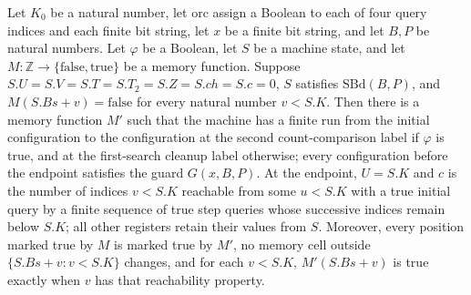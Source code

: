 \begin{theorem}
\label{Complexity.LogProg.ExpBFS.search_run}
\leanok
{}
Let $K_0$ be a natural number, let $\mathrm{orc}$ assign a Boolean to each of four query
indices and each finite bit string, let $x$ be a finite bit string, and let $B,P$ be
natural numbers. Let $\varphi$ be a Boolean, let $S$ be a machine state, and let
$M:\mathbb{Z}\to\{\mathrm{false},\mathrm{true}\}$ be a memory function. Suppose
$S.U=S.V=S.T=S.T_2=S.Z=S.ch=S.c=0$, $S$ satisfies $\mathrm{SBd}(B,P)$, and
$M(S.Bs+v)=\mathrm{false}$ for every natural number $v<S.K$. Then there is a memory
function $M'$ such that the machine has a finite run from the initial configuration to
the configuration at the second count-comparison label if $\varphi$ is true, and at the
first-search cleanup label otherwise; every configuration before the endpoint satisfies
the guard $G(x,B,P)$. At the endpoint, $U=S.K$ and $c$ is the number of indices $v<S.K$
reachable from some $u<S.K$ with a true initial query by a finite sequence of true step
queries whose successive indices remain below $S.K$; all other registers retain their
values from $S$. Moreover, every position marked true by $M$ is marked true by $M'$, no
memory cell outside $\{S.Bs+v:v<S.K\}$ changes, and for each $v<S.K$, $M'(S.Bs+v)$ is
true exactly when $v$ has that reachability property.
\end{theorem}
